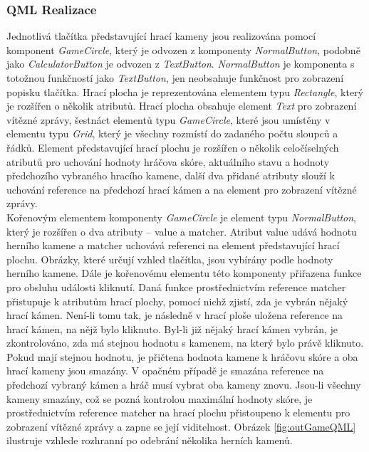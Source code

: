 \documentclass[11pt,twoside,a4paper]{book}
\begin{document}
\subsubsection{QML Realizace}
Jednotlivá tlačítka představující hrací kameny jsou realizována pomocí komponent \textit{GameCircle}, který je odvozen z komponenty \textit{NormalButton}, podobně jako \textit{CalculatorButton} je odvozen z \textit{TextButton}. \textit{NormalButton} je komponenta s totožnou funkčností jako \textit{TextButton}, jen neobsahuje funkčnost pro zobrazení popisku tlačítka.
Hrací plocha je reprezentována elementem typu \textit{Rectangle}, který je rozšířen o několik atributů. Hrací plocha obsahuje element \textit{Text} pro zobrazení vítězné zprávy, šestnáct elementů typu \textit{GameCircle}, které jsou umístěny v elementu typu \textit{Grid}, který je všechny rozmístí do zadaného počtu sloupců a řádků. Element představující hrací plochu je rozšířen o několik celočíselných atributů pro uchování hodnoty hráčova skóre, aktuálního stavu a hodnoty předchozího vybraného hracího kamene, další dva přidané atributy slouží k uchování reference na předchozí hrací kámen a na element pro zobrazení vítězné zprávy.\\
Kořenovým elementem komponenty \textit{GameCircle} je element typu \textit{NormalButton}, který je rozšířen o dva atributy – value a matcher. Atribut value udává hodnotu herního kamene a matcher uchovává referenci na element představující hrací plochu. Obrázky, které určují vzhled tlačítka, jsou vybírány podle hodnoty herního kamene. Dále je kořenovému elementu této komponenty přiřazena funkce pro obsluhu události kliknutí. Daná funkce prostřednictvím reference matcher přistupuje k atributům hrací plochy, pomocí nichž zjistí, zda je vybrán nějaký hrací kámen. Není-li tomu tak, je následně v hrací ploše uložena reference na hrací kámen, na nějž bylo kliknuto. Byl-li již nějaký hrací kámen vybrán, je zkontrolováno, zda má stejnou hodnotu s kamenem, na který bylo právě kliknuto. Pokud mají stejnou hodnotu, je přičtena hodnota kamene k hráčovu skóre a oba hrací kameny jsou smazány. V opačném případě je smazána reference na předchozí vybraný kámen a hráč musí vybrat oba kameny znovu. Jsou-li všechny kameny smazány, což se pozná kontrolou maximální hodnoty skóre, je prostřednictvím reference matcher na hrací plochu přistoupeno k elementu pro zobrazení vítězné zprávy a zapne se její viditelnost. Obrázek \ref{fig:outGameQML} ilustruje vzhlede rozhranní po odebrání několika herních kamenů.
\end{document}
